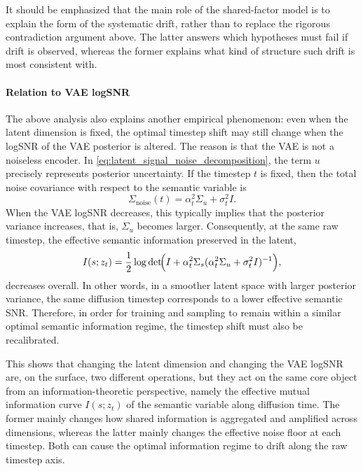 It should be emphasized that the main role of the shared-factor model is to explain the form of the systematic drift, rather than to replace the rigorous contradiction argument above. The latter answers which hypotheses must fail if drift is observed, whereas the former explains what kind of structure such drift is most consistent with.

\paragraph{Relation to VAE logSNR}

The above analysis also explains another empirical phenomenon: even when the latent dimension is fixed, the optimal timestep shift may still change when the logSNR of the VAE posterior is altered. The reason is that the VAE is not a noiseless encoder. In \eqref{eq:latent_signal_noise_decomposition}, the term $u$ precisely represents posterior uncertainty. If the timestep $t$ is fixed, then the total noise covariance with respect to the semantic variable is
\begin{equation}
\Sigma_{\mathrm{noise}}(t)
=
\alpha_t^2\Sigma_u+\sigma_t^2 I.
\label{eq:effective_noise_covariance}
\end{equation}
When the VAE logSNR decreases, this typically implies that the posterior variance increases, that is, $\Sigma_u$ becomes larger. Consequently, at the same raw timestep, the effective semantic information preserved in the latent,
\begin{equation}
I(s;z_t)
=
\frac{1}{2}
\log\det\!\Bigl(
I+\alpha_t^2\Sigma_s
(\alpha_t^2\Sigma_u+\sigma_t^2 I)^{-1}
\Bigr),
\label{eq:semantic_mi_general}
\end{equation}
decreases overall. In other words, in a smoother latent space with larger posterior variance, the same diffusion timestep corresponds to a lower effective semantic SNR. Therefore, in order for training and sampling to remain within a similar optimal semantic information regime, the timestep shift must also be recalibrated.

This shows that changing the latent dimension and changing the VAE logSNR are, on the surface, two different operations, but they act on the same core object from an information-theoretic perspective, namely the effective mutual information curve $I(s;z_t)$ of the semantic variable along diffusion time. The former mainly changes how shared information is aggregated and amplified across dimensions, whereas the latter mainly changes the effective noise floor at each timestep. Both can cause the optimal information regime to drift along the raw timestep axis.

